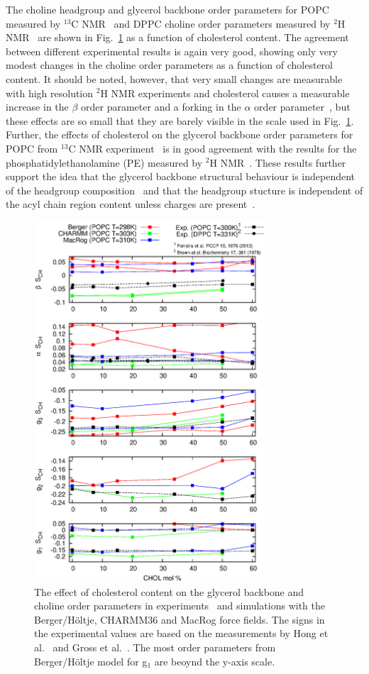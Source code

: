 \documentclass[pre,aps,floatfix,authordate1-4,twocolumn]{revtex4-1}
\begin{document}
The choline headgroup and glycerol backbone order parameters for POPC measured by $^{13}$C NMR~\cite{ferreira13} and DPPC choline order parameters 
measured by $^{2}$H NMR~\cite{brown78} are shown in Fig.~\ref{ordPchol} as a function of cholesterol content.
The agreement between different experimental results is again very good, showing only very modest changes in 
the choline order parameters as a function of cholesterol content. It should be noted, however, that very small
changes are measurable with high resolution $^{2}$H NMR experiments
and cholesterol causes a measurable increase in the $\beta$ order parameter and a forking in the $\alpha$ order
parameter~\cite{brown78}, but these effects are so small that they are barely visible in the scale used in Fig.~\ref{ordPchol}.
Further, the effects of cholesterol on the glycerol backbone order parameters for POPC from $^{13}$C NMR experiment~\cite{ferreira13} 
is in good agreement with the results for the phosphatidylethanolamine (PE) measured by $^{2}$H NMR~\cite{ghosh82}.
These results further support the idea that the glycerol backbone structural behaviour is independent of the
headgroup composition~\cite{gally81} and that the headgroup stucture is independent of the acyl chain region content unless
charges are present~\cite{scherer87}.
\begin{figure}[]
  \centering
  \includegraphics[width=8.6cm]{OrderParameterCHOLexpVSsim.eps}
  \caption{\label{ordPchol}
    The effect of cholesterol content on the glycerol backbone and choline order parameters in experiments~\cite{brown78,ferreira13} and simulations
    with the Berger/H\"oltje, CHARMM36 and MacRog force fields. The signs in the experimental values are based on the measurements by Hong et al.~\cite{hong95a,hong95b} 
    and Gross et al.~\cite{gross97}.  The most order parameters from Berger/Höltje model for g$_1$ are beoynd the y-axis scale.}
\end{figure}
\end{document}
